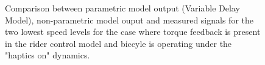 \begin{figure}[!h]
    \centering
    \begin{subfigure}[b]{\textwidth}
        \centering
        \caption{}
        \label{fig:dm_fit1}
    \end{subfigure}
    \begin{subfigure}[b]{\textwidth}
        \centering
        \caption{}
        \label{fig:dm_fit2}
    \end{subfigure}
    
    \caption{Comparison between parametric model output (Variable Delay Model), non-parametric model ouput and measured signals for the two lowest speed levels for the case where torque feedback is present in the rider control model and biccyle is operating under the "haptics on" dynamics.}
    \label{fig:dm_fitA}
 \end{figure}

